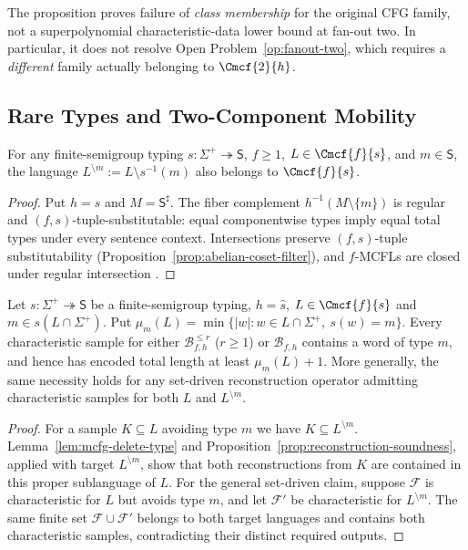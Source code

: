 \begin{remark}
The proposition proves failure of \emph{class membership}
for the original CFG family, not a superpolynomial
characteristic-data lower bound at fan-out two.
In particular, it does not resolve
Open Problem~\ref{op:fanout-two}, which requires a
\emph{different} family actually belonging to
$\Cmcf{2}{h}$.
\end{remark}



\subsection{Rare Types and Two-Component Mobility}
\label{subsec:rare-type-mobility}

\begin{lemma}
\label{lem:mcfg-delete-type}
For any finite-semigroup typing $s:\Sigma^+\twoheadrightarrow\mathsf S$,
$f\ge1$, $L\in\Cmcf{f}{s}$, and $m\in\mathsf S$,
the language $L^{\setminus m}:=L\setminus s^{-1}(m)$
also belongs to $\Cmcf{f}{s}$.
\end{lemma}
\begin{proof}
Put $h=\widehat s$ and $M=\mathsf S^\sharp$. The fiber complement
$h^{-1}(M\setminus\{m\})$ is regular and
$(f,s)$-tuple-substitutable: equal componentwise
types imply equal total types under every sentence context.
Intersections preserve $(f,s)$-tuple substitutability
(Proposition~\ref{prop:abelian-coset-filter}),
and $f$-MCFLs are closed under regular intersection
\cite{SekiEtAl1991}.
\end{proof}

\begin{proposition}
\label{prop:mcfg-rare-type-sample}
Let $s:\Sigma^+\twoheadrightarrow\mathsf S$ be a finite-semigroup typing,
$h=\widehat s$, $L\in\Cmcf{f}{s}$ and $m\in s(L\cap\Sigma^+)$.
Put $\mu_m(L)=\min\{|w|:w\in L\cap\Sigma^+,\ s(w)=m\}$.
Every characteristic sample for either
$\mathcal B^{\le r}_{f,h}$ ($r\ge1$) or
$\mathcal B_{f,h}$ contains a word of type $m$, and hence has
encoded total length at least $\mu_m(L)+1$.
More generally, the same necessity holds for any set-driven
reconstruction operator admitting characteristic samples for
both $L$ and $L^{\setminus m}$.
\end{proposition}
\begin{proof}
For a sample $K\subseteq L$ avoiding type $m$ we have
$K\subseteq L^{\setminus m}$.
Lemma~\ref{lem:mcfg-delete-type} and
Proposition~\ref{prop:reconstruction-soundness}, applied
with target $L^{\setminus m}$, show that both reconstructions
from $K$ are contained in this proper sublanguage of $L$.
For the general set-driven claim, suppose $\mathcal F$ is
characteristic for $L$ but avoids type $m$, and let
$\mathcal F'$ be characteristic for $L^{\setminus m}$.
The same finite set $\mathcal F\cup\mathcal F'$ belongs to
both target languages and contains both characteristic
samples, contradicting their distinct required outputs.
\end{proof}

